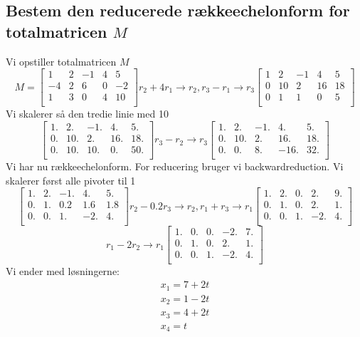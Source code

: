 \documentclass[a4paper,fleqn]{report}
\begin{document}
	\subsection{Bestem den reducerede rækkeechelonform for totalmatricen $M$}
	Vi opstiller totalmatricen $M$
	\[
	M = \begin{bmatrix}
	  1 & 2 & -1 & 4 & 5\\
	  -4 & 2 & 6 & 0 & -2\\
	  1 & 3 & 0 & 4 & 10\\
	\end{bmatrix} r_2 + 4r_1 \rightarrow r_2, r_3 - r_1 \rightarrow r_3
	\begin{bmatrix}
	  1 & 2 & -1 & 4 & 5\\
	  0 & 10 & 2 & 16 & 18\\
	  0 & 1 & 1 & 0 & 5\\
	\end{bmatrix}
	\]
	Vi skalerer så den tredie linie med 10
	\[
	\begin{bmatrix}
	  1. & 2. & -1. & 4. & 5.\\
	  0. & 10. & 2. & 16. & 18.\\
	  0. & 10. & 10. & 0. & 50.\\
	\end{bmatrix} r_3 - r_2 \rightarrow r_3
	\begin{bmatrix}
	  1. & 2. & -1. & 4. & 5.\\
	  0. & 10. & 2. & 16. & 18.\\
	  0. & 0. & 8. & -16. & 32.\\
	\end{bmatrix}
	\]
	Vi har nu rækkeechelonform. For reducering bruger vi backwardreduction. Vi skalerer først
	alle pivoter til 1
	\[
	\begin{bmatrix}
	  1. & 2. & -1. & 4. & 5.\\
	  0. & 1. & 0.2 & 1.6 & 1.8\\
	  0. & 0. & 1. & -2. & 4.\\
	\end{bmatrix} r_2 - 0.2r_3 \rightarrow r_2, r_1 + r_3 \rightarrow r_1 
	\begin{bmatrix}
	  1. & 2. & 0. & 2. & 9.\\
	  0. & 1. & 0. & 2. & 1.\\
	  0. & 0. & 1. & -2. & 4.\\
	\end{bmatrix}
	\]
	\[
	r_1 - 2r_2 \rightarrow r_1
	\begin{bmatrix}
	  1. & 0. & 0. & -2. & 7.\\
	  0. & 1. & 0. & 2. & 1.\\
	  0. & 0. & 1. & -2. & 4.\\
	\end{bmatrix}
	\]
	Vi ender med løsningerne:
	\[\begin{array}{l}x_1 = 7+2t\\x_2 = 1-2t\\x_3 = 4+2t\\x_4 = t\end{array}\]
\end{document}
